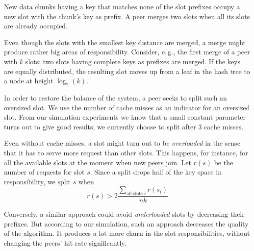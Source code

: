 New data chunks having a key that matches none of the slot prefixes occupy a new slot with the chunk's key as prefix.
A peer merges two slots when all its slots are already occupied.

Even though the slots with the smallest key distance are merged, a merge might produce rather big areas of responsibility.
Consider, e.\,g., the first merge of a peer with $k$ slots: two slots having complete keys as prefixes are merged.
If the keys are equally distributed, the resulting slot moves up from a leaf in the hash tree to a node at height $\log_2(k)$.

In order to restore the balance of the system, a peer seeks to split such an oversized slot.
We use the number of cache misses as an indicator for an oversized slot.
From our simulation experiments we know that a small constant parameter turns out to give good results; 
we currently choose to split after 3 cache misses.

Even without cache misses, a slot might turn out to be \emph{overloaded} in the sense that it has to serve more request than other slots.
This happens, for instance, for all the available slots at the moment when new peers join.
Let $r(s)$ be the number of requests for slot $s$.
Since a split drops half of the key space in responsibility, we split $s$ when $$r(s) > 2\frac{\sum_{\text{all slots $i$}} r(s_i)}{nk}$$

Conversely, a similar approach could avoid \emph{underloaded} slots by decreasing their prefixes.
But according to our simulation, such an approach decreases the quality of the algorithm.
It produces a lot more churn in the slot responsibilities, without changing the peers' hit rate significantly.

